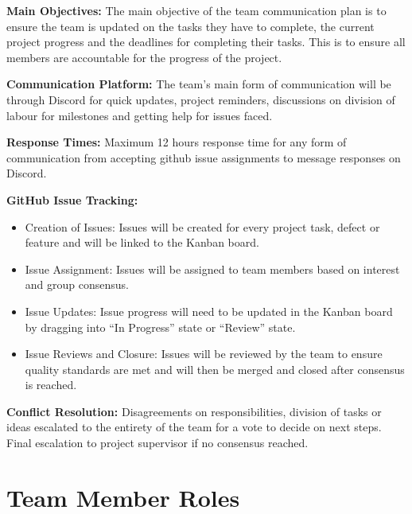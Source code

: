 \documentclass{article}
\begin{document}
\begin{flushleft}
\textbf{Main Objectives:} The main objective of the team communication plan is to ensure the team is updated on the tasks they have to complete, the current project progress and the deadlines for completing their tasks. This is to ensure all members are accountable for the progress of the project.\vspace{1em}

\textbf{Communication Platform:} The team's main form of communication will be through Discord for quick updates, project reminders, discussions on division of labour for milestones and getting help for issues faced.\vspace{1em}

\textbf{Response Times:} Maximum 12 hours response time for any form of communication from accepting github issue assignments to message responses on Discord.\vspace{1em}

\textbf{GitHub Issue Tracking:}
\begin{itemize}
    \item Creation of Issues: Issues will be created for every project task, defect or feature and will be linked to the Kanban board.
    \item Issue Assignment: Issues will be assigned to team members based on interest and group consensus. 
    \item Issue Updates: Issue progress will need to be updated in the Kanban board by dragging into “In Progress” state or “Review” state.
    \item Issue Reviews and Closure: Issues will be reviewed by the team to ensure quality standards are met and will then be merged and closed after consensus is reached.
\end{itemize}

\textbf{Conflict Resolution:} Disagreements on responsibilities, division of tasks or ideas escalated to the entirety of the team for a vote to decide on next steps. Final escalation to project supervisor if no consensus reached.

\end{flushleft}


\section{Team Member Roles}
\end{document}

